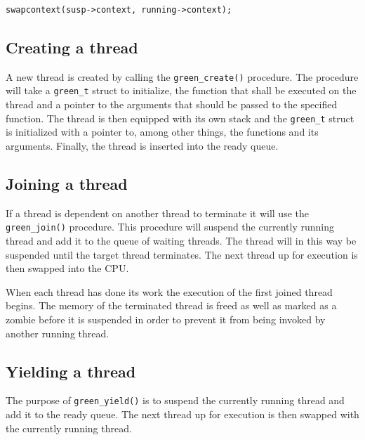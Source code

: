 \documentclass{article}
\begin{document}
\begin{verbatim}
swapcontext(susp->context, running->context);
\end{verbatim}{}

\subsection{Creating a thread}
A new thread is created by calling the \texttt{green\_create()} procedure. The procedure will take a \texttt{green\_t} struct to initialize, the function that shall be executed on the thread and a pointer to the arguments that should be passed to the specified function. The thread is then equipped with its own stack and the \texttt{green\_t} struct is initialized with a pointer to, among other things, the functions and its arguments. Finally, the thread is inserted into the ready queue. 

\subsection{Joining a thread}
If a thread is dependent on another thread to terminate it will use the \texttt{green\_join()} procedure. This procedure will suspend the currently running thread and add it to the queue of waiting threads. The thread will in this way be suspended until the target thread terminates. The next thread up for execution is then swapped into the CPU. 

When each thread has done its work the execution of the first joined thread begins. The memory of the terminated thread is freed as well as marked as a zombie before it is suspended in order to prevent it from being invoked by another running thread.  

\subsection{Yielding a thread}
The purpose of \texttt{green\_yield()} is to suspend the currently running thread and add it to the ready queue. The next thread up for execution is then swapped with the currently running thread. 
\end{document}
